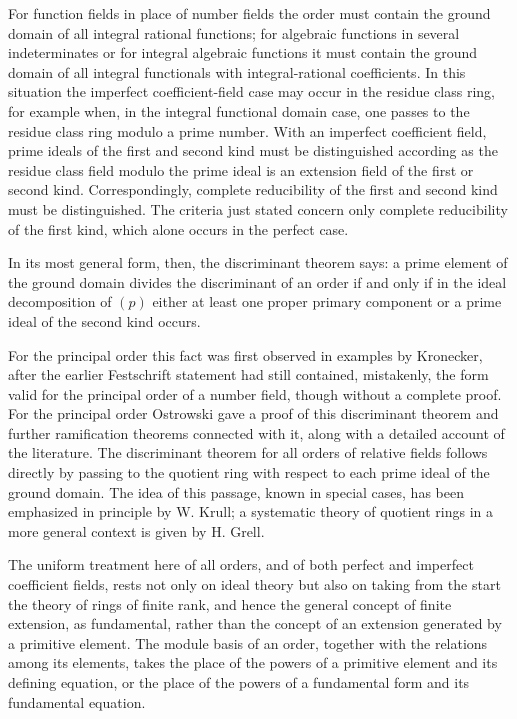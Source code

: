 \documentclass[11pt]{article}
\begin{document}
For function fields in place of number fields the order must contain the
ground domain of all integral rational functions; for algebraic
functions in several indeterminates or for integral algebraic functions
it must contain the ground domain of all integral functionals with
integral-rational coefficients. In this situation the imperfect
coefficient-field case may occur in the residue class ring, for example
when, in the integral functional domain case, one passes to the residue
class ring modulo a prime number. With an imperfect coefficient field,
prime ideals of the first and second kind must be distinguished
according as the residue class field modulo the prime ideal is an
extension field of the first or second kind. Correspondingly, complete
reducibility of the first and second kind must be distinguished. The
criteria just stated concern only complete reducibility of the first
kind, which alone occurs in the perfect case.

In its most general form, then, the discriminant theorem says: a prime
element of the ground domain divides the discriminant of an order if and
only if in the ideal decomposition of \((p)\) either at least one proper
primary component or a prime ideal of the second kind occurs.

For the principal order this fact was first observed in examples by
Kronecker, after the earlier Festschrift statement had still contained,
mistakenly, the form valid for the principal order of a number field,
though without a complete proof. For the principal order Ostrowski gave
a proof of this discriminant theorem and further ramification theorems
connected with it, along with a detailed account of the literature. The
discriminant theorem for all orders of relative fields follows directly
by passing to the quotient ring with respect to each prime ideal of the
ground domain. The idea of this passage, known in special cases, has
been emphasized in principle by W. Krull; a systematic theory of
quotient rings in a more general context is given by H. Grell.

The uniform treatment here of all orders, and of both perfect and
imperfect coefficient fields, rests not only on ideal theory but also on
taking from the start the theory of rings of finite rank, and hence the
general concept of finite extension, as fundamental, rather than the
concept of an extension generated by a primitive element. The module
basis of an order, together with the relations among its elements, takes
the place of the powers of a primitive element and its defining
equation, or the place of the powers of a fundamental form and its
fundamental equation.
\end{document}
